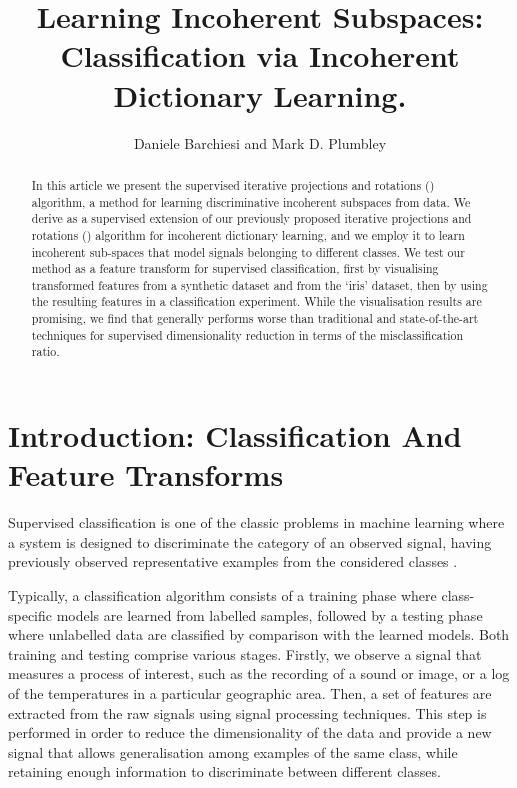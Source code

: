 \documentclass{article}
\title{Learning Incoherent Subspaces: Classification via Incoherent Dictionary Learning.}
\author{Daniele Barchiesi and Mark D. Plumbley}
\begin{document}
%

\maketitle
%
\begin{abstract}
In this article we present the supervised iterative projections and rotations () algorithm, a method for learning discriminative incoherent subspaces from data. We derive  as a supervised extension of our previously proposed iterative projections and rotations () algorithm for incoherent dictionary learning, and we employ it to learn incoherent sub-spaces that model signals belonging to different classes. We test our method as a feature transform for supervised classification, first by visualising transformed features from a synthetic dataset and from the `iris' dataset, then by using the resulting features in a classification experiment. While the visualisation results are promising, we find that  generally performs worse than traditional and state-of-the-art techniques for supervised dimensionality reduction in terms of the misclassification ratio.
\end{abstract}
%
%
\section{Introduction: Classification And Feature Transforms}\label{sec:intro}
Supervised classification is one of the classic problems in machine learning where a system is designed to discriminate the category of an observed signal, having previously observed representative examples from the considered classes \cite{Duda1973Pa}.

Typically, a classification algorithm consists of a training phase where  class-specific models are learned from labelled samples, followed by a testing phase where unlabelled data are classified by comparison with the learned models. Both training and testing comprise various stages. Firstly, we observe a signal that measures a process of interest, such as the recording of a sound or image, or a log of the temperatures in a particular geographic area. Then, a set of features are extracted from the raw signals using signal processing techniques. This step is performed in order to reduce the dimensionality of the data and provide a new signal that allows generalisation among examples of the same class, while retaining enough information to discriminate between different classes. 
\end{document}
